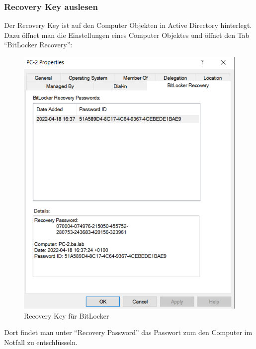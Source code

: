 \subsubsection{Recovery Key auslesen}
Der Recovery Key ist auf den Computer Objekten in Active Directory hinterlegt.
Dazu öffnet man die Einstellungen eines Computer Objektes und öffnet den Tab ``BitLocker Recovery'':
\begin{figure}[H]
    \centering
    \includegraphics[width=0.7\linewidth]{../img/Encryption/bitlocker-recovery.png}
    \caption{Recovery Key für BitLocker}
\end{figure}
Dort findet man unter ``Recovery Password'' das Passwort zum den Computer im Notfall zu entschlüsseln.
